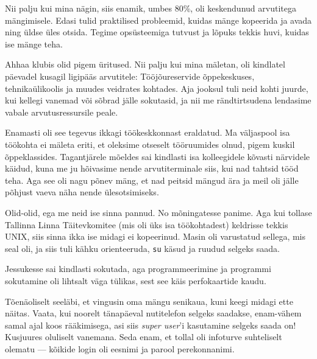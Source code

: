 Nii palju kui mina nägin, siis enamik, umbes 80\%, oli keskendunud arvutitega 
mängimisele. Edasi tulid praktilised probleemid, kuidas mänge 
kopeerida ja avada ning üldse üles otsida. Tegime 
opsüsteemiga tutvust ja lõpuks tekkis huvi, kuidas ise mänge teha.


Ahhaa klubis olid pigem üritused. Nii palju kui mina mäletan, oli 
kindlatel päevadel kusagil ligipääs arvutitele: Tööjõureservide õppekeskuses, tehnikaülikoolis ja muudes veidrates 
kohtades. Aja jooksul tuli neid kohti juurde, kui kellegi vanemad või sõbrad 
jälle sokutasid, ja nii me rändtirtsudena lendasime vabale 
arvutusressursile peale.


Enamasti oli see tegevus ikkagi töökeskkonnast eraldatud. Ma väljaspool 
isa töökohta ei mäleta eriti, et oleksime otseselt tööruumides 
olnud, pigem kuskil õppeklassides. Tagantjärele mõeldes sai kindlasti isa kolleegidele kõvasti närvidele käidud, kuna me ju hõivasime nende arvutiterminale siis, kui nad tahtsid tööd teha. Aga 
see oli nagu põnev mäng, et nad peitsid mängud ära ja meil oli 
jälle põhjust vaeva näha nende ülesotsimiseks.


Olid-olid, ega me neid ise sinna pannud. No mõningatesse panime. Aga kui 
tollase Tallinna Linna Täitevkomitee (mis oli üks isa töökohtadest) 
keldrisse tekkis UNIX, siis sinna ikka ise midagi ei kopeerinud. Masin 
oli varustatud sellega, mis seal oli, ja siis tuli kähku orienteeruda, 
\verb|su| käsud ja ruudud selgeks saada.


Jessukesse sai kindlasti sokutada, aga programmeerimine 
ja programmi sokutamine oli lihtsalt väga tülikas, sest see käis perfokaartide kaudu.


Tõenäoliselt seeläbi, et 
vingusin oma mängu senikaua, kuni keegi midagi ette näitas. Vaata, kui noorelt
tänapäeval nutitelefon selgeks saadakse, enam-vähem samal ajal koos 
rääkimisega, asi siis \emph{super user}'i kasutamine selgeks saada 
on! Kusjuures oluliselt vanemana. Seda enam, et tollal oli infoturve 
suhteliselt olematu --- kõikide login oli eesnimi ja parool 
perekonnanimi.

